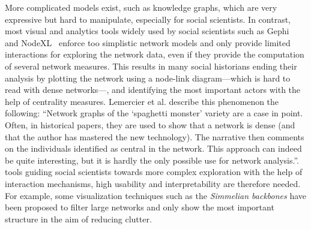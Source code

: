 More complicated models exist, such as knowledge graphs\cite{opitzInductionLargeScaleKnowledge2018}, which are very expressive but hard to manipulate, especially for social scientists.
In contrast, most visual and analytics tools widely used by social scientists such as Gephi~\cite{Gephi} and NodeXL~\cite{NodeXL} enforce too simplistic network models and only provide limited interactions for exploring the network data, even if they provide the computation of several network measures.
This results in many social historians ending their analysis by plotting the network using a node-link diagram---which is hard to read with dense networks---, and identifying the most important actors with the help of centrality measures\cite{lemercierQuantitativeMethodsHumanities2019}.
Lemercier et al. describe this phenomenon the following: ``Network graphs of the `spaghetti monster' variety are a case in point. Often, in historical papers, they are used to show that a network is dense (and that the author has mastered the new technology). The narrative then comments on the individuals identified as central in the network. This approach can indeed be quite interesting, but it is hardly the only possible use for network analysis.\cite{lemercierQuantitativeMethodsHumanities2019}''.
\va tools guiding social scientists towards more complex exploration with the help of interaction mechanisms, high usability and interpretability are therefore needed.
For example, some visualization techniques such as the \textit{Simmelian backbones}\cite{nickSimmelianBackbonesAmplifying2013} have been proposed to filter large networks and only show the most important structure in the aim of reducing clutter.


